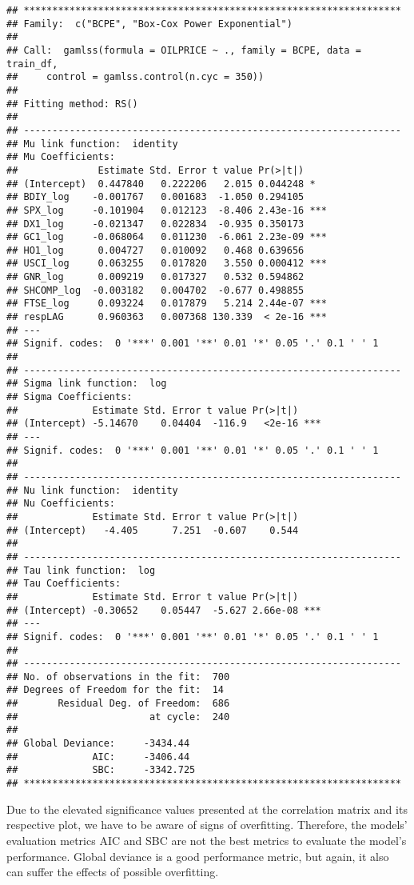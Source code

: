 \documentclass[
]{article}
\begin{document}
\begin{verbatim}
## ******************************************************************
## Family:  c("BCPE", "Box-Cox Power Exponential") 
## 
## Call:  gamlss(formula = OILPRICE ~ ., family = BCPE, data = train_df,  
##     control = gamlss.control(n.cyc = 350)) 
## 
## Fitting method: RS() 
## 
## ------------------------------------------------------------------
## Mu link function:  identity
## Mu Coefficients:
##              Estimate Std. Error t value Pr(>|t|)    
## (Intercept)  0.447840   0.222206   2.015 0.044248 *  
## BDIY_log    -0.001767   0.001683  -1.050 0.294105    
## SPX_log     -0.101904   0.012123  -8.406 2.43e-16 ***
## DX1_log     -0.021347   0.022834  -0.935 0.350173    
## GC1_log     -0.068064   0.011230  -6.061 2.23e-09 ***
## HO1_log      0.004727   0.010092   0.468 0.639656    
## USCI_log     0.063255   0.017820   3.550 0.000412 ***
## GNR_log      0.009219   0.017327   0.532 0.594862    
## SHCOMP_log  -0.003182   0.004702  -0.677 0.498855    
## FTSE_log     0.093224   0.017879   5.214 2.44e-07 ***
## respLAG      0.960363   0.007368 130.339  < 2e-16 ***
## ---
## Signif. codes:  0 '***' 0.001 '**' 0.01 '*' 0.05 '.' 0.1 ' ' 1
## 
## ------------------------------------------------------------------
## Sigma link function:  log
## Sigma Coefficients:
##             Estimate Std. Error t value Pr(>|t|)    
## (Intercept) -5.14670    0.04404  -116.9   <2e-16 ***
## ---
## Signif. codes:  0 '***' 0.001 '**' 0.01 '*' 0.05 '.' 0.1 ' ' 1
## 
## ------------------------------------------------------------------
## Nu link function:  identity 
## Nu Coefficients:
##             Estimate Std. Error t value Pr(>|t|)
## (Intercept)   -4.405      7.251  -0.607    0.544
## 
## ------------------------------------------------------------------
## Tau link function:  log 
## Tau Coefficients:
##             Estimate Std. Error t value Pr(>|t|)    
## (Intercept) -0.30652    0.05447  -5.627 2.66e-08 ***
## ---
## Signif. codes:  0 '***' 0.001 '**' 0.01 '*' 0.05 '.' 0.1 ' ' 1
## 
## ------------------------------------------------------------------
## No. of observations in the fit:  700 
## Degrees of Freedom for the fit:  14
##       Residual Deg. of Freedom:  686 
##                       at cycle:  240 
##  
## Global Deviance:     -3434.44 
##             AIC:     -3406.44 
##             SBC:     -3342.725 
## ******************************************************************
\end{verbatim}

Due to the elevated significance values presented at the correlation
matrix and its respective plot, we have to be aware of signs of
overfitting. Therefore, the models' evaluation metrics AIC and SBC are
not the best metrics to evaluate the model's performance. Global
deviance is a good performance metric, but again, it also can suffer the
effects of possible overfitting.
\end{document}
